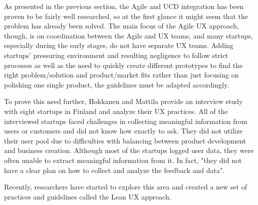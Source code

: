 \documentclass{article}
\begin{document}
As presented in the previous section, the Agile and UCD integration has been proven to be fairly well researched, so at the first glance it might seem that the problem has already been solved. The main focus of the Agile UX approach, though, is on coordination between the Agile and UX teams, and many startups, especially during the early stages, do not have separate UX teams. Adding startups' pressuring environment and resulting negligence to follow strict processes as well as the need to quickly create different prototypes to find the right problem/solution and product/market fits rather than just focusing on polishing one single product, the guidelines must be adapted accordingly.

To prove this need further, Hokkanen and Mattila provide an interview study with eight startups in Finland \cite{hokkanen2015ux} and analyze their UX practices. All of the interviewed startups faced challenges in collecting meaningful information from users or customers and did not know how exactly to ask. They did not utilize their user pool due to difficulties with balancing between product development and business creation. Although most of the startups logged user data, they were often unable to extract meaningful information from it. In fact, "they did not have a clear plan on how to collect and analyze the feedback and data".

Recently, researchers have started to explore this area and created a new set of practices and guidelines called the Lean UX approach.
\end{document}
